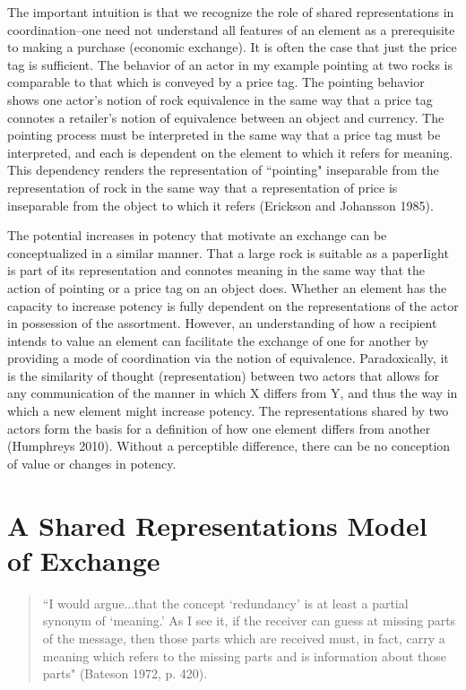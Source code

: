 The important intuition is that we recognize the role of shared representations in coordination--one need not understand all features of an element as a prerequisite to making a purchase (economic exchange). It is often the case that just the price tag is sufficient. The behavior of an actor in my example pointing at two rocks is comparable to that which is conveyed by a price tag. The pointing behavior shows one actor's notion of rock equivalence in the same way that a price tag connotes a retailer's notion of equivalence between an object and currency. The pointing process must be interpreted in the same way that a price tag must be interpreted, and each is dependent on the element to which it refers for meaning. This dependency renders the representation of ``pointing" inseparable from the representation of rock in the same way that a representation of price is inseparable from the object to which it refers (Erickson and Johansson 1985). 

The potential increases in potency that motivate an exchange can be conceptualized in a similar manner. That a large rock is suitable as a paperIight is part of its representation and connotes meaning in the same way that the action of pointing or a price tag on an object does. Whether an element has the capacity to increase potency is fully dependent on the representations of the actor in possession of the assortment. However, an understanding of how a recipient intends to value an element can facilitate the exchange of one for another by providing a mode of coordination via the notion of equivalence. Paradoxically, it is the similarity of thought (representation) between two actors that allows for any communication of the manner in which X differs from Y, and thus the way in which a new element might increase potency. The representations shared by two actors form the basis for a definition of how one element differs from another (Humphreys 2010). Without a perceptible difference, there can be no conception of value or changes in potency. 

\section{A Shared Representations Model of Exchange\label{ent}}
\begin{small}
\begin{quote}
 ``I would argue...that the concept `redundancy' is at least a partial synonym of `meaning.' As I see it, if the receiver can guess at missing parts of the message, then those parts which are received must, in fact, carry a meaning which refers to the missing parts and is information about those parts" (Bateson 1972, p. 420).
 \end{quote}
 \end{small}
 
